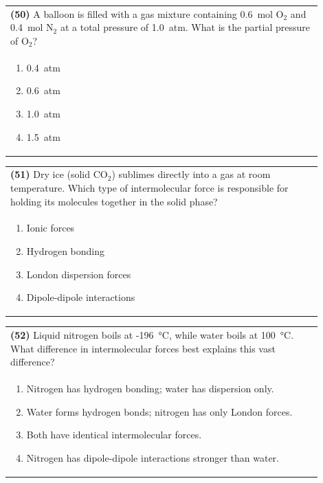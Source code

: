 \documentclass{article}
\begin{document}
{{\noindent\begin{tabular}{|p{0.9\linewidth}|}
\hline
\textbf{(50)} A balloon is filled with a gas mixture containing 0.6~mol O$_2$ and 0.4~mol N$_2$ at a total pressure of 1.0~atm. What is the partial pressure of O$_2$?\\[0.2cm]
\begin{minipage}[t]{0.85\linewidth}
\begin{enumerate}[label=\alph*.]
\item 0.4~atm
\item 0.6~atm
\item 1.0~atm
\item 1.5~atm
\end{enumerate}
\end{minipage}\\[0.2cm]
\hline
\end{tabular}

\vspace{0.2cm}
\noindent\begin{tabular}{|p{0.9\linewidth}|}
\hline
\textbf{(51)} Dry ice (solid CO$_2$) sublimes directly into a gas at room temperature. Which type of intermolecular force is responsible for holding its molecules together in the solid phase?\\[0.2cm]
\begin{minipage}[t]{0.85\linewidth}
\begin{enumerate}[label=\alph*.]
\item Ionic forces
\item Hydrogen bonding
\item London dispersion forces
\item Dipole-dipole interactions
\end{enumerate}
\end{minipage}\\[0.2cm]
\hline
\end{tabular}

\noindent\begin{tabular}{|p{0.9\linewidth}|}
\hline
\textbf{(52)} Liquid nitrogen boils at -196~°C, while water boils at 100~°C. What difference in intermolecular forces best explains this vast difference?\\[0.2cm]
\begin{minipage}[t]{0.85\linewidth}
\begin{enumerate}[label=\alph*.]
\item Nitrogen has hydrogen bonding; water has dispersion only.
\item Water forms hydrogen bonds; nitrogen has only London forces.
\item Both have identical intermolecular forces.
\item Nitrogen has dipole-dipole interactions stronger than water. 
\end{enumerate}
\end{minipage}\\[0.2cm]
\hline
\end{tabular}
\newpage

}}
\end{document}
